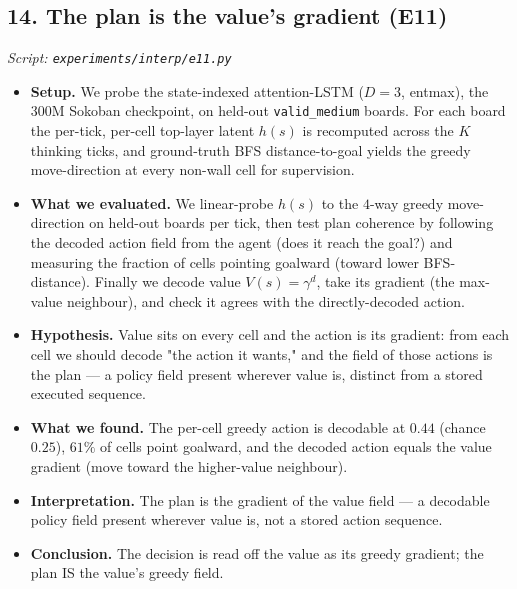 \documentclass[11pt]{article}
\begin{document}
\subsection*{14. The plan is the value's gradient (E11)}
\textit{Script: \texttt{experiments/interp/e11.py}}
\begin{itemize}
\item \textbf{Setup.} We probe the state-indexed attention-LSTM ($D=3$, entmax), the $300$M Sokoban checkpoint, on held-out \texttt{valid\_medium} boards. For each board the per-tick, per-cell top-layer latent $h(s)$ is recomputed across the $K$ thinking ticks, and ground-truth BFS distance-to-goal yields the greedy move-direction at every non-wall cell for supervision.
\item \textbf{What we evaluated.} We linear-probe $h(s)$ to the $4$-way greedy move-direction on held-out boards per tick, then test plan coherence by following the decoded action field from the agent (does it reach the goal?) and measuring the fraction of cells pointing goalward (toward lower BFS-distance). Finally we decode value $V(s)=\gamma^{d}$, take its gradient (the max-value neighbour), and check it agrees with the directly-decoded action.
\item \textbf{Hypothesis.} Value sits on every cell and the action is its gradient: from each cell we should decode "the action it wants," and the field of those actions is the plan --- a policy field present wherever value is, distinct from a stored executed sequence.
\item \textbf{What we found.} The per-cell greedy action is decodable at $0.44$ (chance $0.25$), $61\%$ of cells point goalward, and the decoded action equals the value gradient (move toward the higher-value neighbour).
\item \textbf{Interpretation.} The plan is the gradient of the value field --- a decodable policy field present wherever value is, not a stored action sequence.
\item \textbf{Conclusion.} The decision is read off the value as its greedy gradient; the plan IS the value's greedy field.
\end{itemize}
\clearpage
\end{document}
